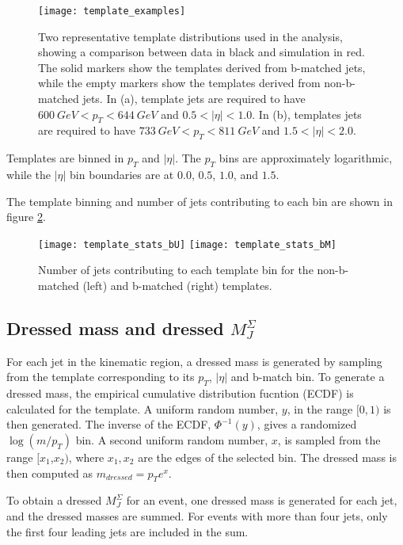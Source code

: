 \begin{figure}[h]
\texttt{[image: template\_examples]}
\caption{Two representative template distributions used in the analysis, showing a
  comparison between data in black and simulation in
  red. The solid markers show the templates derived from b-matched
  jets, while the empty markers show the templates derived from
  non-b-matched jets. In (a), template jets are required to have
  $600~GeV < p_{T} < 644~GeV$ and $0.5 <|\eta|<1.0$. In (b), templates
  jets are required to have $733~GeV < p_{T} < 811~GeV$ and $1.5<|\eta|<2.0$.}
\label{fig:template_examples}
\end{figure}

Templates are binned in $p_T$ and $|\eta|$. The $p_T$ bins are
approximately logarithmic, while the $|\eta|$ bin boundaries are at
$0.0$, $0.5$, $1.0$, and $1.5$. 

The template binning and number of jets contributing to each bin are
shown in figure \ref{fig:template_stats}.

\begin{figure}[h]
\texttt{[image: template\_stats\_bU]}
\texttt{[image: template\_stats\_bM]}
\caption{Number of jets contributing to each template bin for the
  non-b-matched (left) and b-matched (right) templates.}
\label{fig:template_stats}
\end{figure}

\subsection{Dressed mass and dressed $M_{J}^{\Sigma}$}
For each jet in the kinematic region, a dressed mass is generated by sampling from
the template corresponding to its $p_T$, $|\eta|$ and b-match bin. To
generate a dressed mass, the empirical cumulative distribution fucntion (ECDF)
is calculated for the template. A uniform random number, $y$, in the
range $[0,1)$ is then
generated. The inverse of the ECDF, $\Phi^{-1}(y)$, gives a randomized
$\log\left(m/p_T\right)$ bin. A second uniform random number, $x$, is sampled from the range
$[x_1$,$x_2)$, where $x_1,x_2$ are the edges of the selected bin. The
dressed mass is then computed as $m_{dressed} = p_{T}e^x$.

To obtain a dressed $M_{J}^{\Sigma}$ for an event, one dressed mass is
generated for each jet, and the dressed masses are summed. For
events with more than four jets, only the first four leading jets are
included in the sum.

